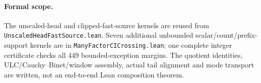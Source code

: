 \paragraph{Formal scope.}
The unscaled-head and clipped-fast-source kernels are reused from
\texttt{UnscaledHeadFastSource.lean}. Seven additional unbounded
scalar/count/prefix-support kernels are in
\texttt{ManyFactorCICrossing.lean}; one complete integer certificate
checks all 449 bounded-exception margins. The quotient identities,
ULC/Cauchy--Binet/window assembly, actual tail alignment and mode
transport are written, not an end-to-end Lean composition theorem.
